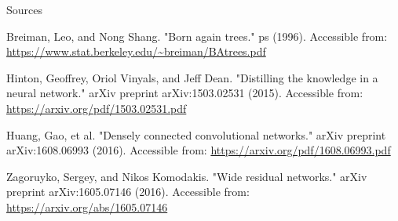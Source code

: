 \documentclass{beamer}
\begin{document}
\begin{frame}{Sources}

\begin{thebibliography}{0}
   Breiman, Leo, and Nong Shang. "Born again trees." ps (1996). Accessible from: \url{https://www.stat.berkeley.edu/~breiman/BAtrees.pdf}
  
   Hinton, Geoffrey, Oriol Vinyals, and Jeff Dean. "Distilling the knowledge in a neural network." arXiv preprint arXiv:1503.02531 (2015). Accessible from: \url{https://arxiv.org/pdf/1503.02531.pdf}
  
   Huang, Gao, et al. "Densely connected convolutional networks." arXiv preprint arXiv:1608.06993 (2016). Accessible from: \url{https://arxiv.org/pdf/1608.06993.pdf}
  
   Zagoruyko, Sergey, and Nikos Komodakis. "Wide residual networks." arXiv preprint arXiv:1605.07146 (2016). Accessible from: \url{https://arxiv.org/abs/1605.07146}
\end{thebibliography}

\end{frame}
 
 
 
\end{document}
